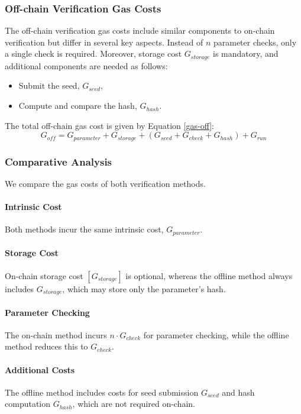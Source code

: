 \documentclass[runningheads]{llncs}
\begin{document}
\subsubsection{Off-chain Verification Gas Costs}
The off-chain verification gas costs include similar components to on-chain verification but differ in several key aspects. Instead of \( n \) parameter checks, only a single check is required. Moreover, storage cost \( G_{storage} \) is mandatory, and additional components are needed as follows:
\begin{itemize}
    \item Submit the seed, \( G_{seed} \),
    \item Compute and compare the hash, \( G_{hash} \).
\end{itemize}
The total off-chain gas cost is given by Equation \ref{gas-off}:
\begin{equation}
\label{gas-off}
G_{off} = G_{parameter} + G_{storage} + (G_{seed} + G_{check} + G_{hash}) + G_{run}
\end{equation}

\subsubsection{Comparative Analysis}
We compare the gas costs of both verification methods.

\paragraph*{Intrinsic Cost} Both methods incur the same intrinsic cost, \( G_{parameter} \).

\paragraph*{Storage Cost} On-chain storage cost \( [G_{storage}] \) is optional, whereas the offline method always includes \( G_{storage} \), which may store only the parameter's hash.

\paragraph*{Parameter Checking} The on-chain method incurs \( n \cdot G_{check} \) for parameter checking, while the offline method reduces this to \( G_{check} \).

\paragraph*{Additional Costs} The offline method includes costs for seed submission \( G_{seed} \) and hash computation \( G_{hash} \), which are not required on-chain.
\end{document}
